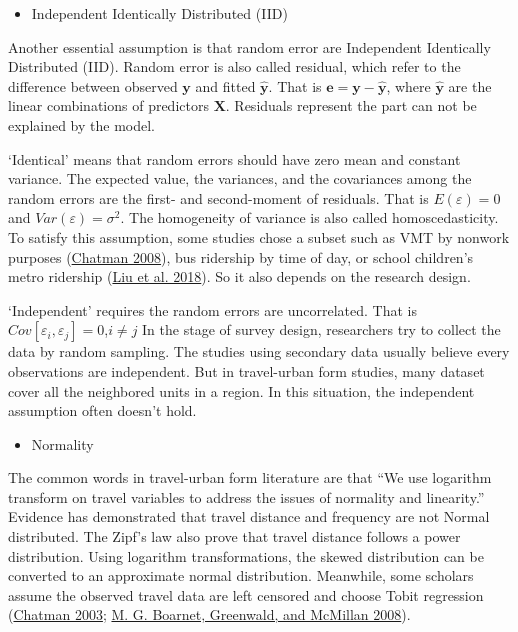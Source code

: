 \documentclass[
  11pt,
  openany]{memoir}
\providecommand{\tightlist}{%
  \setlength{\itemsep}{0pt}\setlength{\parskip}{0pt}}
\begin{document}
\begin{itemize}
\tightlist
\item
  Independent Identically Distributed (IID)
\end{itemize}

Another essential assumption is that random error are Independent Identically Distributed (IID). Random error is also called residual, which refer to the difference between observed \(\mathbf{y}\) and fitted \(\mathbf{\hat y}\).
That is \(\mathbf{e}=\mathbf{y}-\mathbf{\hat y}\), where \(\mathbf{\hat y}\) are the linear combinations of predictors \(\mathbf{X}\). Residuals represent the part can not be explained by the model.

`Identical' means that random errors should have zero mean and constant variance. The expected value, the variances, and the covariances among the random errors are the first- and second-moment of residuals.
That is \(E(\varepsilon) = 0\) and \(Var(\varepsilon) = \sigma^2\).
The homogeneity of variance is also called homoscedasticity.
To satisfy this assumption, some studies chose a subset such as VMT by nonwork purposes (\protect\hyperlink{ref-chatmanDeconstructingDevelopmentDensity2008}{Chatman 2008}), bus ridership by time of day, or school children's metro ridership (\protect\hyperlink{ref-liuInfluenceBuiltEnvironment2018}{Liu et al. 2018}). So it also depends on the research design.

`Independent' requires the random errors are uncorrelated. That is \(Cov[\varepsilon_i,\varepsilon_j] = 0\),\(i\neq j\)
In the stage of survey design, researchers try to collect the data by random sampling.
The studies using secondary data usually believe every observations are independent.
But in travel-urban form studies, many dataset cover all the neighbored units in a region. In this situation, the independent assumption often doesn't hold.

\begin{itemize}
\tightlist
\item
  Normality
\end{itemize}

The common words in travel-urban form literature are that ``We use logarithm transform on travel variables to address the issues of normality and linearity.''
Evidence has demonstrated that travel distance and frequency are not Normal distributed. The Zipf's law also prove that travel distance follows a power distribution. Using logarithm transformations, the skewed distribution can be converted to an approximate normal distribution.
Meanwhile, some scholars assume the observed travel data are left censored and choose Tobit regression (\protect\hyperlink{ref-chatmanHowDensityMixed2003}{Chatman 2003}; \protect\hyperlink{ref-boarnetWalkingUrbanDesign2008}{M. G. Boarnet, Greenwald, and McMillan 2008}).
\end{document}
